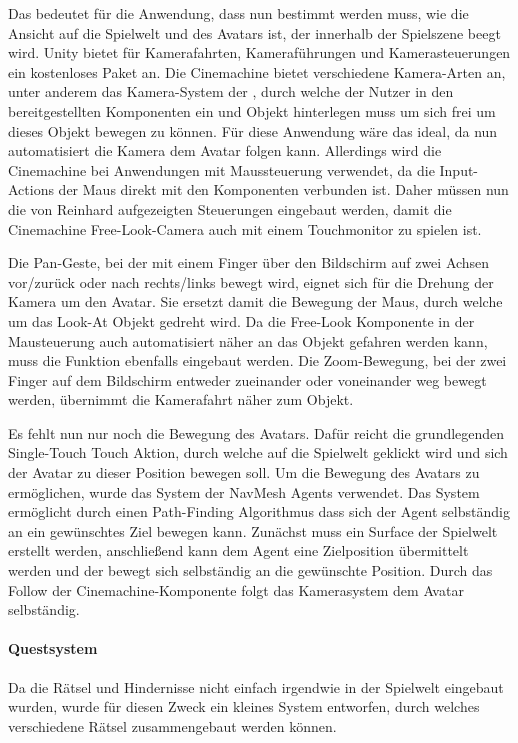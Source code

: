Das bedeutet für die Anwendung, dass nun bestimmt werden muss, wie die Ansicht auf die Spielwelt und des Avatars ist, der innerhalb der Spielszene beegt wird. Unity bietet für Kamerafahrten, Kameraführungen und Kamerasteuerungen ein kostenloses Paket an. Die Cinemachine bietet verschiedene Kamera-Arten an, unter anderem das Kamera-System der , durch welche der Nutzer in den bereitgestellten Komponenten ein  und  Objekt hinterlegen muss um sich frei um dieses Objekt bewegen zu können. Für diese Anwendung wäre das ideal, da nun automatisiert die Kamera dem Avatar folgen kann. Allerdings wird die Cinemachine bei Anwendungen mit Maussteuerung verwendet, da die Input-Actions der Maus direkt mit den Komponenten verbunden ist. Daher müssen nun die von Reinhard aufgezeigten Steuerungen eingebaut werden, damit die Cinemachine Free-Look-Camera auch mit einem Touchmonitor zu spielen ist. 

Die Pan-Geste, bei der mit einem Finger über den Bildschirm auf zwei Achsen vor/zurück oder nach rechts/links bewegt wird, eignet sich für die Drehung der Kamera um den Avatar. Sie ersetzt damit die Bewegung der Maus, durch welche um das Look-At Objekt gedreht wird. Da die Free-Look Komponente in der Mausteuerung auch automatisiert näher an das Objekt gefahren werden kann, muss die Funktion ebenfalls eingebaut werden. Die Zoom-Bewegung, bei der zwei Finger auf dem Bildschirm entweder zueinander oder voneinander weg bewegt werden, übernimmt die Kamerafahrt näher zum Objekt.

Es fehlt nun nur noch die Bewegung des Avatars. Dafür reicht die grundlegenden Single-Touch Touch Aktion, durch welche auf die Spielwelt geklickt wird und sich der Avatar zu dieser Position bewegen soll. Um die Bewegung des Avatars zu ermöglichen, wurde das System der NavMesh Agents verwendet. Das System ermöglicht durch einen Path-Finding Algorithmus dass sich der Agent selbständig an ein gewünschtes Ziel bewegen kann. Zunächst muss ein Surface der Spielwelt erstellt werden, anschließend kann dem Agent eine Zielposition übermittelt werden und der bewegt sich selbständig an die gewünschte Position. Durch das Follow der Cinemachine-Komponente folgt das Kamerasystem dem Avatar selbständig.

\paragraph{Questsystem}\label{sec:quest-system}
Da die Rätsel und Hindernisse nicht einfach irgendwie in der Spielwelt eingebaut wurden, wurde für diesen Zweck ein kleines System entworfen, durch welches verschiedene Rätsel zusammengebaut werden können.

